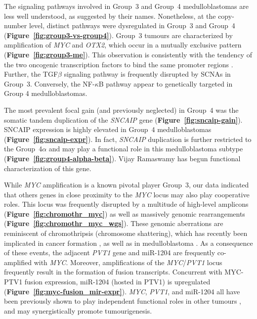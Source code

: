 \documentclass[11pt,letterpaper]{article}
\theoremstyle{definition}
\begin{document}
The signaling pathways involved in Group~3 and Group~4 medulloblastomas are less well understood, as suggested by their names. Nonetheless, at the copy-number level, distinct pathways were dysregulated in Group~3 and Group~4 (\textbf{Figure~\ref{fig:group3-vs-group4}}). Group~3 tumours are characterized by amplification of \emph{MYC} and \emph{OTX2}, which occur in a mutually exclusive pattern (\textbf{Figure~\ref{fig:group3-me}}). This observation is consistently with the tendency of the two oncogenic transcription factors to bind the same promoter regions . Further, the TGF$\beta$ signaling pathway is frequently disrupted by SCNAs in Group~3. Conversely, the NF-$\kappa$B pathway appear to genetically targeted in Group 4 medulloblastomas.

The most prevalent focal gain (and previously neglected) in Group~4 was the somatic tandem duplication of the \emph{SNCAIP} gene (\textbf{Figure~\ref{fig:sncaip-gain}}). SNCAIP expression is highly elevated in Group~4 medulloblastomas (\textbf{Figure~\ref{fig:sncaip-expr}}). In fact, \emph{SNCAIP} duplication is further restricted to the Group~4$\alpha$ and may play a functional role in this medulloblastoma subtype (\textbf{Figure~\ref{fig:group4-alpha-beta}}). Vijay Ramaswamy has begun functional characterization of this gene.

While \emph{MYC} amplification is a known pivotal player Group~3, our data indicated that others genes in close proximity to the \emph{MYC} locus may also play cooperative roles. This locus was frequently disrupted by a multitude of high-level amplicons (\textbf{Figure~\ref{fig:chromothr_myc}}) as well as massively genomic rearrangements (\textbf{Figure~\ref{fig:chromothr_myc_wgs}}). These genomic aberrations are reminiscent of chromothripsis (chromosome shattering), which has recently been implicated in cancer formation , as well as in medulloblastoma . As a consequence of these events, the adjacent \emph{PVT1} gene and miR-1204 are frequently co-amplified with \emph{MYC}. Moreover, amplifications of the \emph{MYC}/\emph{PVT1} locus frequently result in the formation of fusion transcripts. Concurrent with MYC-PTV1 fusion expression, miR-1204 (hosted in PTV1) is upregulated (\textbf{Figure~\ref{fig:myc-fusion_mir-expr}}). \emph{MYC}, \emph{PVT1}, and miR-1204 all have been previously shown to play independent functional roles in other tumours , and may synergistically promote tumourigenesis.
\end{document}
